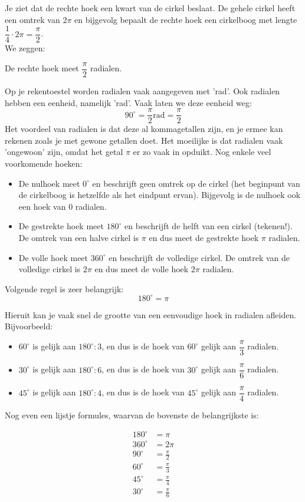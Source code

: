 Je ziet dat de rechte hoek een kwart van de cirkel beslaat. De gehele cirkel heeft een omtrek van $2\pi$ en bijgevolg bepaalt de rechte hoek een cirkelboog met lengte $\dfrac{1}{4} \cdot 2\pi = \dfrac{\pi}{2}$.\\ We zeggen:

De rechte hoek meet $\dfrac{\pi}{2}$ radialen.

Op je rekentoestel worden radialen vaak aangegeven met 'rad'. Ook radialen hebben een eenheid, namelijk 'rad'. Vaak laten we deze eenheid weg:
\[90^\circ = \frac{\pi}{2} \text{rad}=\frac{\pi}{2}\]
Het voordeel van radialen is dat deze al kommagetallen zijn, en je ermee kan rekenen zoals je met gewone getallen doet. Het moeilijke is dat radialen vaak 'ongewoon' zijn, omdat het getal $\pi$ er zo vaak in opduikt.  Nog enkele veel voorkomende hoeken:
\begin{itemize}
	\item De nulhoek meet $0^\circ$ en beschrijft geen omtrek op de cirkel (het beginpunt van de cirkelboog is hetzelfde als het eindpunt ervan). Bijgevolg is de nulhoek ook een hoek van $0$ radialen.
	\item De gestrekte hoek meet $180^\circ$ en beschrijft de helft van een cirkel (tekenen!). De omtrek van een halve cirkel is $\pi$ en dus meet de gestrekte hoek $\pi$ radialen.
	\item De volle hoek meet $360^\circ$ en beschrijft de volledige cirkel. De omtrek van de volledige cirkel is $2\pi$ en dus meet de volle hoek $2\pi$ radialen.
\end{itemize}

Volgende regel is zeer belangrijk:
\[180^\circ=\pi\]

Hieruit kan je vaak snel de grootte van een eenvoudige hoek in radialen afleiden. Bijvoorbeeld:
\begin{itemize}
	\item $60^\circ$ is gelijk aan $180^\circ:3$, en dus is de hoek van $60^\circ$ gelijk aan $\dfrac{\pi}{3}$ radialen.
	\item $30^\circ$ is gelijk aan $180^\circ:6$, en dus is de hoek van $30^\circ$ gelijk aan $\dfrac{\pi}{6}$ radialen.
	\item $45^\circ$ is gelijk aan $180^\circ:4$, en dus is de hoek van $45^\circ$ gelijk aan $\dfrac{\pi}{4}$ radialen.
\end{itemize}

Nog even een lijstje formules, waarvan de bovenste de belangrijkste is:

\begin{align*}
180^\circ&=\pi\\
360^\circ&=2\pi\\
90^\circ&=\frac{\pi}{2}\\
60^\circ&=\frac{\pi}{3}\\
45^\circ&=\frac{\pi}{4}\\
30^\circ&=\frac{\pi}{6}
\end{align*}

